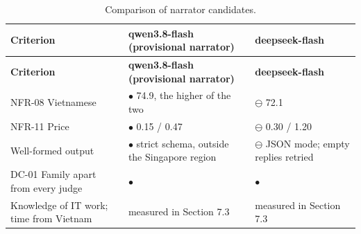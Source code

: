 {\small
\begin{longtable}{|>{\raggedright\arraybackslash}p{}|>{\raggedright\arraybackslash}p{}|>{\raggedright\arraybackslash}p{}|}
\caption{Comparison of narrator candidates.} \\
\hline
\textbf{Criterion} & \textbf{qwen3.\allowbreak{}8-\allowbreak{}flash (provisional narrator)} & \textbf{deepseek-\allowbreak{}flash} \\ \hline
\endfirsthead
\hline
\textbf{Criterion} & \textbf{qwen3.\allowbreak{}8-\allowbreak{}flash (provisional narrator)} & \textbf{deepseek-\allowbreak{}flash} \\ \hline
\endhead
NFR-08 Vietnamese & $\bullet$ 74.9, the higher of the two & $\ominus$ 72.1 \\ \hline
NFR-11 Price & $\bullet$ 0.15 / 0.47 & $\ominus$ 0.30 / 1.20 \\ \hline
Well-formed output & $\bullet$ strict schema, outside the Singapore region & $\ominus$ JSON mode; empty replies retried \\ \hline
DC-01 Family apart from every judge & $\bullet$ & $\bullet$ \\ \hline
Knowledge of IT work; time from Vietnam & measured in Section 7.3 & measured in Section 7.3 \\ \hline
\end{longtable}
}

